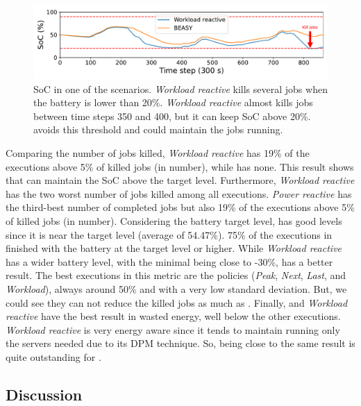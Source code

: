 \begin{figure}[!htb]
    \centering
    \includegraphics[scale=0.5]{Images/Heuristic/diff_state_of_charge.pdf}
    \caption[SoC comparison between \emph{Workload reactive} and \emph{\systemName}.]{SoC in one of the scenarios. \emph{Workload reactive} kills several jobs when the battery is lower than 20\%. \emph{Workload reactive} almost kills jobs between time steps 350 and 400, but it can keep SoC above 20\%. \emph{\systemName} avoids this threshold and could maintain the jobs running.}
    \label{fig:soc_average}
\end{figure}

Comparing the number of jobs killed, \emph{Workload reactive} has 19\% of the executions above 5\% of killed jobs (in number), while \emph{\systemName} has none. This result shows that \emph{\systemName} can maintain the SoC above the target level. Furthermore, \emph{Workload reactive} has the two worst number of jobs killed among all executions. \emph{Power reactive} has the third-best number of completed jobs but also 19\% of the executions above 5\% of killed jobs (in number). Considering the battery target level, \emph{\systemName} has good levels since it is near the target level (average of 54.47\%). 75\% of the executions in \emph{\systemName} finished with the battery at the target level or higher. While \emph{Workload reactive} has a wider battery level, with the minimal being close to -30\%, \emph{\systemName} has a better result. The best executions in this metric are the policies (\emph{Peak}, \emph{Next}, \emph{Last}, and \emph{Workload}), always around 50\% and with a very low standard deviation. But, we could see they can not reduce the killed jobs as much as \emph{\systemName}. Finally, \emph{\systemName} and \emph{Workload reactive} have the best result in wasted energy, well below the other executions. \emph{Workload reactive} is very energy aware since it tends to maintain running only the servers needed due to its DPM technique. So, being close to the same result is quite outstanding for \emph{\systemName}. 

\subsection{Discussion}

